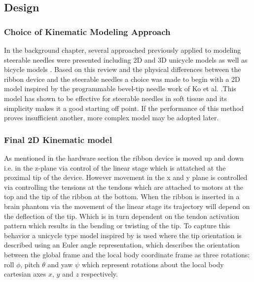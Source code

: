 \subsection{Design}

\subsubsection{Choice of Kinematic Modeling Approach}
In the background chapter, several approached previously applied to modeling steerable needles were presented including 2D \cite{ko_two-dimensional_2010} and 3D unicycle models \cite{secoli_closed-loop_2013} as well as bicycle models \cite{webster_nonholonomic_2006} \cite{fallahi_extended_2015}. Based on this review and the physical differences between the ribbon device and the steerable needles a choice was made to begin with a 2D model inspired by the programmable bevel-tip needle work of Ko et al. \cite{ko_two-dimensional_2010}.This model has shown to be effective for steerable needles in soft tissue and its simplicity makes it a good starting off point. If the performance of this method proves insufficient another, more complex model may be adopted later.

\subsubsection{Final 2D Kinematic model}
As mentioned in the hardware section the ribbon device is moved up and down i.e. in the z-plane via control of the linear stage which is attatched at the proximal tip of the device. However movement in the x and y plane is controlled via controlling the tensions at the tendons which are attached to motors at the top and the tip of the ribbon at the bottom. When the ribbon is inserted in a brain phantom via the movement of the linear stage its trajectory will depend on the deflection of the tip. Which is in turn dependent on the tendon activation pattern which results in the bending or twisting of the tip. 
\newline \newline
To capture this behavior a unicycle type model inspired by \cite{ko_two-dimensional_2010} is used where the tip orientation is described using an Euler angle representation, which describes the orientation between the global frame and the local body coordinate frame as three rotations: roll \(\phi\), pitch \(\theta\) and yaw \(\psi\) which represent rotations about the local body cartesian axes \(x\), \(y\) and \(z\) respectively.

